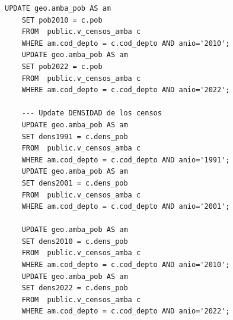 \documentclass{article}
\theoremstyle{mytheoremstyle}
\theoremstyle{mytheoremstyle}
\theoremstyle{myproblemstyle}
\begin{document}
\begin{lstlisting}[caption={CreateTables.sql},label={lst:sql_CreateTables}]
    UPDATE geo.amba_pob AS am
    SET pob2010 = c.pob
    FROM  public.v_censos_amba c
    WHERE am.cod_depto = c.cod_depto AND anio='2010';
    UPDATE geo.amba_pob AS am
    SET pob2022 = c.pob
    FROM  public.v_censos_amba c
    WHERE am.cod_depto = c.cod_depto AND anio='2022';
    
    --- Update DENSIDAD de los censos
    UPDATE geo.amba_pob AS am
    SET dens1991 = c.dens_pob
    FROM  public.v_censos_amba c
    WHERE am.cod_depto = c.cod_depto AND anio='1991';
    UPDATE geo.amba_pob AS am
    SET dens2001 = c.dens_pob
    FROM  public.v_censos_amba c
    WHERE am.cod_depto = c.cod_depto AND anio='2001';
    
    UPDATE geo.amba_pob AS am
    SET dens2010 = c.dens_pob
    FROM  public.v_censos_amba c
    WHERE am.cod_depto = c.cod_depto AND anio='2010';
    UPDATE geo.amba_pob AS am
    SET dens2022 = c.dens_pob
    FROM  public.v_censos_amba c
    WHERE am.cod_depto = c.cod_depto AND anio='2022';
    
  \end{lstlisting}
\end{document}
